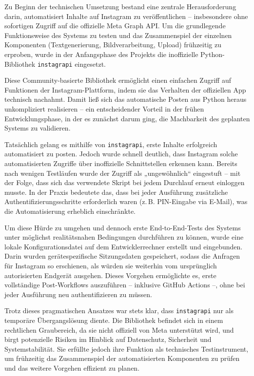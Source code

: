 \documentclass[a4paper,12pt]{article}
\begin{document}
Zu Beginn der technischen Umsetzung bestand eine zentrale Herausforderung darin, automatisiert Inhalte auf Instagram zu veröffentlichen – insbesondere ohne sofortigen Zugriff auf die offizielle Meta Graph API. Um die grundlegende Funktionsweise des Systems zu testen und das Zusammenspiel der einzelnen Komponenten (Textgenerierung, Bildverarbeitung, Upload) frühzeitig zu erproben, wurde in der Anfangsphase des Projekts die inoffizielle Python-Bibliothek \texttt{instagrapi} eingesetzt.

Diese Community-basierte Bibliothek ermöglicht einen einfachen Zugriff auf Funktionen der Instagram-Plattform, indem sie das Verhalten der offiziellen App technisch nachahmt. Damit ließ sich das automatische Posten aus Python heraus unkompliziert realisieren – ein entscheidender Vorteil in der frühen Entwicklungsphase, in der es zunächst darum ging, die Machbarkeit des geplanten Systems zu validieren.

Tatsächlich gelang es mithilfe von \texttt{instagrapi}, erste Inhalte erfolgreich automatisiert zu posten. Jedoch wurde schnell deutlich, dass Instagram solche automatisierten Zugriffe über inoffizielle Schnittstellen erkennen kann. Bereits nach wenigen Testläufen wurde der Zugriff als „ungewöhnlich“ eingestuft – mit der Folge, dass sich das verwendete Skript bei jedem Durchlauf erneut einloggen musste. In der Praxis bedeutete das, dass bei jeder Ausführung zusätzliche Authentifizierungsschritte erforderlich waren (z.\,B. PIN-Eingabe via E-Mail), was die Automatisierung erheblich einschränkte.

Um diese Hürde zu umgehen und dennoch erste End-to-End-Tests des Systems unter möglichst realitätsnahen Bedingungen durchführen zu können, wurde eine lokale Konfigurationsdatei auf dem Entwicklerrechner erstellt und eingebunden. Darin wurden gerätespezifische Sitzungsdaten gespeichert, sodass die Anfragen für Instagram so erschienen, als würden sie weiterhin vom ursprünglich autorisierten Endgerät ausgehen. Dieses Vorgehen ermöglichte es, erste vollständige Post-Workflows auszuführen – inklusive GitHub Actions –, ohne bei jeder Ausführung neu authentifizieren zu müssen.

Trotz dieses pragmatischen Ansatzes war stets klar, dass \texttt{instagrapi} nur als temporäre Übergangslösung diente. Die Bibliothek befindet sich in einem rechtlichen Graubereich, da sie nicht offiziell von Meta unterstützt wird, und birgt potenzielle Risiken im Hinblick auf Datenschutz, Sicherheit und Systemstabilität. Sie erfüllte jedoch ihre Funktion als technisches Testinstrument, um frühzeitig das Zusammenspiel der automatisierten Komponenten zu prüfen und das weitere Vorgehen effizient zu planen.
\end{document}
